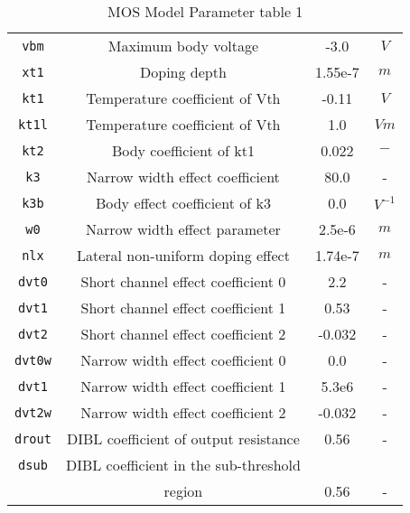 \documentclass{article}
\begin{document}
\begin{table}[H]
\begin{tabular}{|c| c| c| c|}
\texttt{vbm} & Maximum body voltage & -3.0 & $V$\\
\texttt{xt1} & Doping depth & 1.55e-7 & $m$\\
\texttt{kt1} & Temperature coefficient of Vth & -0.11 & $V$\\
\texttt{kt1l} & Temperature coefficient of Vth & 1.0 & $Vm$\\
\texttt{kt2} & Body coefficient of kt1 & 0.022 & $-$\\
\texttt{k3} & Narrow width effect coefficient & 80.0 & -\\
\texttt{k3b} & Body effect coefficient of k3 & 0.0 & $V^{-1}$\\
\texttt{w0} & Narrow width effect parameter & 2.5e-6 & $m$\\
\texttt{nlx} & Lateral non-uniform doping effect & 1.74e-7 & $m$\\
\texttt{dvt0} & Short channel effect coefficient 0 & 2.2 & -\\
\texttt{dvt1} & Short channel effect coefficient 1 & 0.53 & -\\
\texttt{dvt2} & Short channel effect coefficient 2 & -0.032 & -\\
\texttt{dvt0w} & Narrow width effect coefficient 0 & 0.0 & -\\
\texttt{dvt1} & Narrow width effect coefficient 1 & 5.3e6 & -\\
\texttt{dvt2w} & Narrow width effect coefficient 2 & -0.032 & - \\
\texttt{drout} & DIBL coefficient of output resistance & 0.56 & -\\
\texttt{dsub} & DIBL coefficient in the sub-threshold & & \\
              & region & 0.56 & - \\
\hline
\end{tabular}
\caption{\label{bsim3.params1} MOS Model Parameter table 1}
\end{table}
\end{document}

